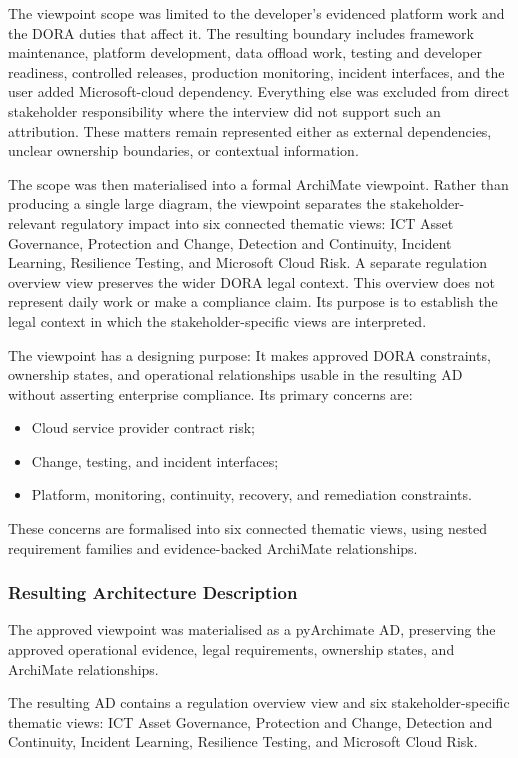 The viewpoint scope was limited to the developer's evidenced platform work and the \ac{DORA} duties that affect it. The resulting boundary includes framework maintenance, platform development, data offload work, testing and developer readiness, controlled releases, production monitoring, incident interfaces, and the user added Microsoft-cloud dependency. Everything else was excluded from direct stakeholder responsibility where the interview did not support such an attribution. These matters remain represented either as external dependencies, unclear ownership boundaries, or contextual information.

The scope was then materialised into a formal ArchiMate viewpoint. Rather than producing a single large diagram, the viewpoint separates the stakeholder-relevant regulatory impact into six connected thematic views: \ac{ICT} Asset Governance, Protection and Change, Detection and Continuity, Incident Learning, Resilience Testing, and Microsoft Cloud Risk. A separate regulation overview view preserves the wider \ac{DORA} legal context. This overview does not represent daily work or make a compliance claim. Its purpose is to establish the legal context in which the stakeholder-specific views are interpreted.

The viewpoint has a designing purpose: It makes approved \ac{DORA} constraints, ownership states, and operational relationships usable in the resulting \ac{AD} without asserting enterprise compliance. Its primary concerns are:
\begin{itemize}
    \item Cloud service provider contract risk;
    \item Change, testing, and incident interfaces;
    \item Platform, monitoring, continuity, recovery, and remediation constraints.
\end{itemize}
 These concerns are formalised into six connected thematic views, using nested requirement families and evidence-backed ArchiMate relationships.


\subsubsection{Resulting Architecture Description}

The approved viewpoint was materialised as a pyArchimate \ac{AD}, preserving the approved operational evidence, legal requirements, ownership states, and ArchiMate relationships.

The resulting \ac{AD} contains a regulation overview view and six stakeholder-specific thematic views: \ac{ICT} Asset Governance, Protection and Change, Detection and Continuity, Incident Learning, Resilience Testing, and Microsoft Cloud Risk.

